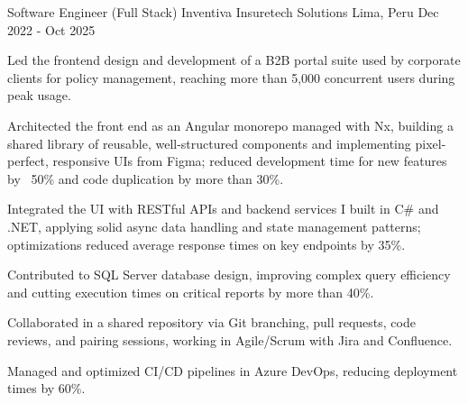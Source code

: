 

\begin{cventries}

  \cventry
    {Software Engineer (Full Stack)} %
    {Inventiva Insuretech Solutions} %
    {Lima, Peru} %
    {Dec 2022 - Oct 2025} %
    {
      \begin{cvitems} %
        \item {Led the frontend design and development of a B2B portal suite used by corporate clients for policy management, reaching more than 5,000 concurrent users during peak usage.}
        \item {Architected the front end as an Angular monorepo managed with Nx, building a shared library of reusable, well-structured components and implementing pixel-perfect, responsive UIs from Figma; reduced development time for new features by ~50\% and code duplication by more than 30\%.}
        \item {Integrated the UI with RESTful APIs and backend services I built in C\# and .NET, applying solid async data handling and state management patterns; optimizations reduced average response times on key endpoints by 35\%.}
        \item {Contributed to SQL Server database design, improving complex query efficiency and cutting execution times on critical reports by more than 40\%.}
        \item {Collaborated in a shared repository via Git branching, pull requests, code reviews, and pairing sessions, working in Agile/Scrum with Jira and Confluence.}
        \item {Managed and optimized CI/CD pipelines in Azure DevOps, reducing deployment times by 60\%.}
      \end{cvitems}
    }

\end{cventries}
